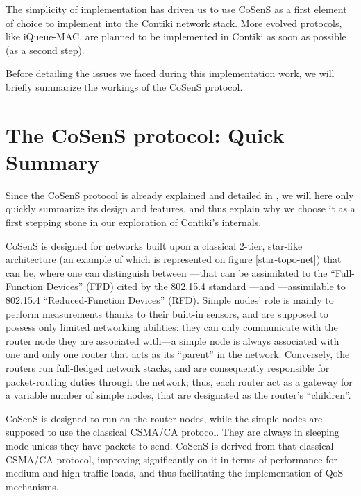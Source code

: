 \documentclass[12pt,twoside,a4paper]{article}
\begin{document}
The simplicity of implementation has driven us to use CoSenS as a first
element of choice to implement into the Contiki network stack.
More evolved protocols, like iQueue-MAC, are planned to be implemented
in Contiki as soon as possible (as a second step).

Before detailing the issues we faced during this implementation work,
we will briefly summarize the workings of the CoSenS protocol.


\section{The CoSenS protocol: Quick Summary}

Since the CoSenS protocol is already explained and detailed in \cite{cosens},
we will here only quickly summarize its design and features, and thus explain
why we choose it as a first stepping stone in our exploration of Contiki's
internals.

CoSenS is designed for networks built upon a classical 2-tier, star-like
architecture (an example of which is represented on figure \ref{star-topo-net})
that can be, where one can distinguish between ---that
can be assimilated to the ``Full-Function Devices'' (FFD) cited by
the 802.15.4 standard \cite{std802154}---and ---assimilable to 802.15.4 ``Reduced-Function Devices'' (RFD).
Simple nodes' role is mainly to perform measurements thanks to their
built-in sensors, and are supposed to possess only limited networking
abilities: they can only communicate with the router node they are
associated with---a simple node is always associated with one and only
one router that acts as its ``parent'' in the network. Conversely,
the routers run full-fledged network stacks, and are consequently
responsible for packet-routing duties through the network; thus,
each router act as a gateway for a variable number of simple nodes,
that are designated as the router's ``children''.

CoSenS is designed to run on the router nodes, while the simple nodes
are supposed to use the classical CSMA/CA protocol. They are always
in sleeping mode unless they have packets to send.
CoSenS is derived from that classical CSMA/CA protocol, improving
significantly on it in terms of performance for medium and high traffic
loads, and thus facilitating the implementation of QoS mechanisms.
\end{document}
